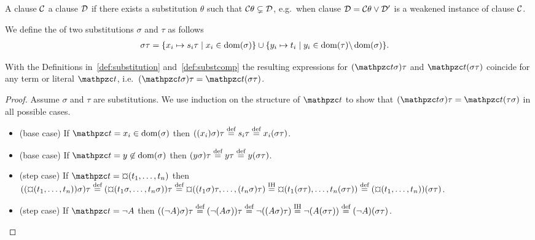 \begin{definition}\label{def:strictly:subsumes}
	A clause \( \mcC \)  a clause \( \mcD \) if there exists a substitution \( \theta \) such that \( \mcC\theta \subsetneq \mcD \),
	e.g.~when clause \( \mcD = \mcC\theta \lor \mcD' \) is a weakened instance of clause \( \mcC \).
\end{definition}

\begin{definition}\label{def:substcomp}
We define the  of two substitutions \( \sigma \) and \( \tau \) as follows
	\begin{align*}
		\sigma\tau&=\{ x_i\mapsto s_i\tau\mid x_i\in\domain(\sigma) \}
		\cup
		\{ y_i\mapsto t_i\mid y_i\in\domain(\tau) \backslash \domain(\sigma) \}.
	\end{align*}
\end{definition}

\begin{lemma}\label{lem:substitution}
	With the Definitions in~\ref{def:substitution} and~\ref{def:substcomp} the resulting expressions for
	\( (\mct\sigma)\tau \) and \( \mct( \sigma\tau) \) coincide for
	any term or literal \( \mct \), i.e.~\( (\mct\sigma)\tau = \mct( \sigma\tau) \).
\end{lemma}

\begin{proof}
	Assume \( \sigma \) and \( \tau \) are substitutions.
	We use induction on the structure of \( \mct \)
	to show that
	\( (\mct\sigma)\tau = \mct(\tau\sigma) \) in all possible cases.
	\begin{itemize}
		\item (base case) If \( \mct = x_i \in\domain(\sigma) \) then
		\( ((x_i)\sigma)\tau\defEQ s_i\tau\defEQ x_i(\sigma\tau) \).

		\item (base case) If \( \mct = y \not\in\domain(\sigma) \) then
		\( (y\sigma)\tau \defEQ y\tau \defEQ y(\sigma\tau) \).

		\item (step case) If \( \mct = \Pf(t_1,\ldots,t_n) \)
		then
		\(
			((\Pf(t_1,\ldots,t_n))\sigma)\tau
		\defEQ
		(\Pf(t_1\sigma,\ldots,t_n\sigma))\tau
		\defEQ
		\Pf((t_1\sigma)\tau,\ldots,(t_n\sigma)\tau)
		\defEQ[IH]
		\Pf(t_1(\sigma\tau),\ldots,t_n(\sigma\tau))
		\defEQ
		(\Pf(t_1,\ldots,t_n))(\sigma\tau)
		\).

		\item (step case) If \( \mct = \lnot A \) then
		\(
		((\lnot A)\sigma)\tau
		\defEQ
		(\lnot(A\sigma))\tau
		\defEQ
		\lnot((A\sigma)\tau)
		\defEQ[IH]
		\lnot(A(\sigma\tau))
		\defEQ
		(\lnot A)(\sigma\tau)
		\).
	\end{itemize}
\end{proof}
